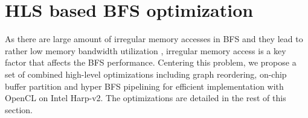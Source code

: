 \section{HLS based BFS optimization} \label{sec:bfs-opt}
As there are large amount of irregular memory accesses in BFS 
and they lead to rather low memory bandwidth 
utilization \cite{wang2017multikernel}, irregular memory access is a key 
factor that affects the BFS performance. Centering this problem, 
we propose a set of combined high-level optimizations including graph 
reordering, on-chip buffer partition 
and hyper BFS pipelining for efficient implementation 
with OpenCL on Intel Harp-v2. The optimizations are 
detailed in the rest of this section. 

%


